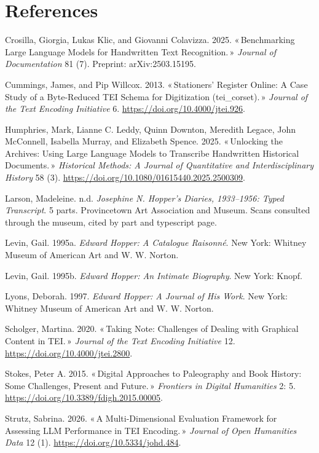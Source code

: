 \documentclass[11pt]{article}
\newcommand{\q}[1]{«\,#1\,»}
\begin{document}
\section*{References}
\begin{list}{}{\setlength{\leftmargin}{1.5em}\setlength{\itemindent}{-1.5em}\setlength{\itemsep}{3pt}}
\item Crosilla, Giorgia, Lukas Klic, and Giovanni Colavizza. 2025. \q{Benchmarking Large Language Models for Handwritten Text Recognition.} \emph{Journal of Documentation} 81 (7). Preprint: arXiv:2503.15195.
\item Cummings, James, and Pip Willcox. 2013. \q{Stationers' Register Online: A Case Study of a Byte-Reduced TEI Schema for Digitization (tei\_corset).} \emph{Journal of the Text Encoding Initiative} 6. \url{https://doi.org/10.4000/jtei.926}.
\item Humphries, Mark, Lianne C. Leddy, Quinn Downton, Meredith Legace, John McConnell, Isabella Murray, and Elizabeth Spence. 2025. \q{Unlocking the Archives: Using Large Language Models to Transcribe Handwritten Historical Documents.} \emph{Historical Methods: A Journal of Quantitative and Interdisciplinary History} 58 (3). \url{https://doi.org/10.1080/01615440.2025.2500309}.
\item Larson, Madeleine. n.d. \emph{Josephine N. Hopper's Diaries, 1933--1956: Typed Transcript}. 5 parts. Provincetown Art Association and Museum. Scans consulted through the museum, cited by part and typescript page.
\item Levin, Gail. 1995a. \emph{Edward Hopper: A Catalogue Raisonné}. New York: Whitney Museum of American Art and W. W. Norton.
\item Levin, Gail. 1995b. \emph{Edward Hopper: An Intimate Biography}. New York: Knopf.
\item Lyons, Deborah. 1997. \emph{Edward Hopper: A Journal of His Work}. New York: Whitney Museum of American Art and W. W. Norton.
\item Scholger, Martina. 2020. \q{Taking Note: Challenges of Dealing with Graphical Content in TEI.} \emph{Journal of the Text Encoding Initiative} 12. \url{https://doi.org/10.4000/jtei.2800}.
\item Stokes, Peter A. 2015. \q{Digital Approaches to Paleography and Book History: Some Challenges, Present and Future.} \emph{Frontiers in Digital Humanities} 2: 5. \url{https://doi.org/10.3389/fdigh.2015.00005}.
\item Strutz, Sabrina. 2026. \q{A Multi-Dimensional Evaluation Framework for Assessing LLM Performance in TEI Encoding.} \emph{Journal of Open Humanities Data} 12 (1). \url{https://doi.org/10.5334/johd.484}.

\end{list}
\end{document}
